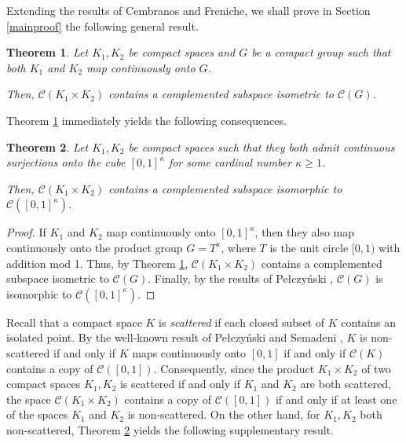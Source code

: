 \documentclass[12pt,fleqn]{amsart}
\numberwithin{equation}{section}
\newtheorem{thm}{Theorem}[section]
\theoremstyle{definition}
\def\C{\mathcal C}
\begin{document}

Extending the results of Cembranos and Freniche, we shall prove  in Section \ref{mainproof} the following general result.

\begin{thm}
\label{main}
Let $K_1, K_2$ be compact spaces and $G$ be a compact group such that
both $K_1$ and $K_2$ map continuously onto $G$.

Then, $\C(K_1 \times K_2)$ contains a complemented subspace isometric to $\C(G)$. 
\end{thm}

Theorem \ref{main} immediately yields the following consequences.

\begin{thm}
\label{main2}
Let $K_1, K_2$ be  compact spaces such that
they both admit continuous surjections onto the cube $[0,1]^\kappa$ for some
cardinal number $\kappa\ge 1$.

Then, $\C(K_1 \times K_2)$ contains a complemented subspace isomorphic to $\C([0, 1]^\kappa)$. 
\end{thm}


\begin{proof} %
If $K_1$ and $K_2$ map continuously onto $[0,1]^\kappa$, then they also map continuously onto the product  group 
$G=T^\kappa$, where $T$ is the unit circle $[0,1)$ with addition mod 1.
Thus, by Theorem \ref{main}, $\C(K_1 \times K_2)$ contains a complemented subspace isometric to $\C(G)$. Finally, by the results of Pe{\l}czy\'nski \cite[Theorems 8.8 and 8.9]{Pe68}, $\C(G)$ is isomorphic to $\C([0,1]^{\kappa})$.
\end{proof}

Recall that a compact space $K$ is \emph{scattered} if each closed subset of $K$ contains an isolated point. By the well-known result of Pe\l czy\'{n}ski and Semadeni \cite{PS59}, $K$ is non-scattered if and only if $K$ maps continuously onto $[0,1]$ if and only if $\C(K)$ contains a copy of $\C([0,1])$. Consequently, since the product $K_1\times K_2$ of two compact spaces $K_1,K_2$ is scattered if and only if $K_1$ and $K_2$ are both scattered, the space $\C(K_1\times K_2)$ contains a copy of $\C([0,1])$ if and only if at least one of the spaces $K_1$ and $K_2$ is non-scattered. On the other hand, for $K_1, K_2$ both non-scattered, Theorem \ref{main2} yields the following supplementary result.
\end{document}
